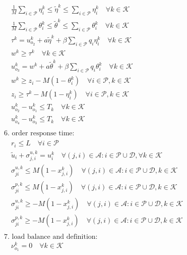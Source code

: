 \documentclass[10pt]{article}
\begin{document}
\begin{align*}
& \quad \frac{1}{M} \sum_{i \in \mathcal{P}} \eta_i^k \le \tilde{\eta}^k \le \sum_{i \in \mathcal{P}} \eta_i^k \quad \forall k \in \mathcal{K} \\
& \quad \frac{1}{M} \sum_{i \in \mathcal{P}} \theta_i^k \le \tilde{\theta}^k \le \sum_{i \in \mathcal{P}} \theta_i^k \quad \forall k \in \mathcal{K} \\
& \quad \tau^k = u_{o_2}^k + a \tilde{\eta}^k + \beta \sum_{i \in \mathcal{P}} q_i \eta_i^k \quad \forall k \in \mathcal{K} \\
& \quad w^k \ge \tau^k \quad \forall k \in \mathcal{K} \\
& \quad u_{o_3}^k = w^k + a \tilde{\theta}^k + \beta \sum_{i \in \mathcal{P}} q_i \theta_i^k \quad \forall k \in \mathcal{K} \\
& \quad w^k \ge z_i - M(1 - \theta_i^k) \quad \forall i \in \mathcal{P}, k \in \mathcal{K} \\
& \quad z_i \ge \tau^k - M(1 - \eta_i^k) \quad \forall i \in \mathcal{P}, k \in \mathcal{K} \\
& \quad u_{o_2}^k - u_{o_1}^k \le T_k \quad \forall k \in \mathcal{K} \\
& \quad u_{o_4}^k - u_{o_3}^k \le T_k \quad \forall k \in \mathcal{K} \\
\\
& \text{6. order response time:} \\
& \quad r_i \le L \quad \forall i \in \mathcal{P} \\
& \quad \tilde{u}_i + \sigma_{j, i}^{u,k} = u_i^k \quad \forall (j, i) \in \mathcal{A}: i \in \mathcal{P} \cup \mathcal{D}, \forall k \in \mathcal{K} \\
& \quad \sigma_{j i}^{u,k} \le M(1 - x_{j, i}^k) \quad \forall (j, i) \in \mathcal{A}: i \in \mathcal{P} \cup \mathcal{D}, k \in \mathcal{K} \\
& \quad \sigma_{j i}^{p,k} \le M(1 - x_{j, i}^k) \quad \forall (j, i) \in \mathcal{A}: i \in \mathcal{P} \cup \mathcal{D}, k \in \mathcal{K} \\
& \quad \sigma_{j i}^{u,k} \ge -M(1 - x_{j, i}^k) \quad \forall (j, i) \in \mathcal{A}: i \in \mathcal{P} \cup \mathcal{D}, k \in \mathcal{K} \\
& \quad \sigma_{j i}^{p,k} \ge -M(1 - x_{j, i}^k) \quad \forall (j, i) \in \mathcal{A}: i \in \mathcal{P} \cup \mathcal{D}, k \in \mathcal{K} \\
\\
& \text{7. load balance and definition:} \\
& \quad \nu_{o_1}^k = 0 \quad \forall k \in \mathcal{K} \\

\end{align*}
\end{document}
